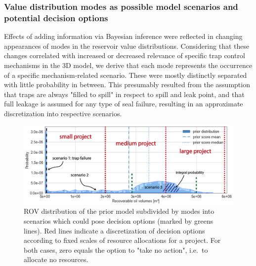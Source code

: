 	\subsubsection{Value distribution modes as possible model scenarios and potential decision options}	
	Effects of adding information via Bayesian inference were reflected in changing appearances of modes in the reservoir value distributions. Considering that these changes correlated with increased or decreased relevance of specific trap control mechanisms in the 3D model, we derive that each mode represents the occurrence of a specific mechanism-related scenario. These were mostly distinctly separated with little probability in between. This presumably resulted from the assumption that traps are always "filled to spill" in respect to spill and leak point, and that full leakage is assumed for any type of seal failure, resulting in an approximate discretization into respective scenarios.
	\begin{figure}[h]
		\centering
		\includegraphics[width=1\textwidth]{Figures/scenarios_options}
		\caption{ROV distribution of the prior model subdivided by modes into scenarios which could pose decision options (marked by greens lines). Red lines indicate a discretization of decision options according to fixed scales of resource allocations for a project. For both cases, zero equals the option to "take no action", i.e.\ to allocate no resources.}\label{fig:scenarios_options}
	\end{figure}\\
